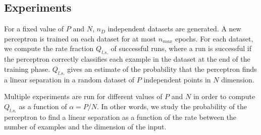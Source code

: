\subsection{Experiments}
For a fixed value of $P$ and $N$, $n_D$ independent datasets are generated.
A new perceptron is trained on each dataset for at most $n_{max}$ epochs.
For each dataset, we compute the rate fraction $Q_{l.s.}$ of successful runs, where a run is successful if the perceptron correctly classifies each example in the dataset at the end of the training phase.
$Q_{l.s.}$ gives an estimate of the probability that the perceptron finds a linear separation in a random dataset of $P$ independent points in $N$ dimension.

Multiple experiments are run for different values of $P$ and $N$ in order to compute $Q_{l.s.}$ as a function of $\alpha = P / N$.
In other words, we study the probability of the perceptron to find a linear separation as a function of the rate between the number of examples and the dimension of the input.

